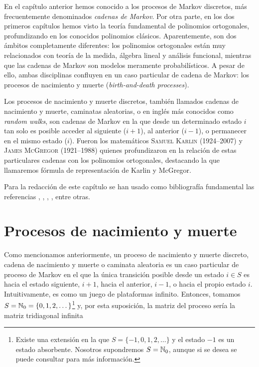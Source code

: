 
En el capítulo anterior hemos conocido a los procesos de Markov discretos, más frecuentemente denominados \textit{cadenas de Markov}. Por otra parte, en los dos primeros capítulos hemos visto la teoría fundamental de polinomios ortogonales, profundizando en los conocidos polinomios clásicos. Aparentemente, son dos ámbitos completamente diferentes: los polinomios ortogonales están muy relacionados con teoría de la medida, álgebra lineal y análisis funcional, mientras que las cadenas de Markov son modelos meramente probabilísticos. A pesar de ello, ambas disciplinas confluyen en un caso particular de cadena de Markov: los procesos de nacimiento y muerte (\textit{birth-and-death processes}). 

Los procesos de nacimiento y muerte discretos, también llamados cadenas de nacimiento y muerte, caminatas aleatorias, o en inglés más conocidos como \textit{random walks}, son cadenas de Markov en la que desde un determinado estado $i$ tan solo es posible acceder al siguiente ($i+1$), al anterior ($i-1$), o permanecer en el mismo estado ($i$). Fueron los matemáticos \textsc{Samuel Karlin} (1924--2007) y \textsc{James McGregor} (1921--1988) quienes profundizaron en la relación de estas particulares cadenas con los polinomios ortogonales, destacando la que llamaremos fórmula de representación de Karlin y McGregor.

Para la redacción de este capítulo se han usado como bibliografía fundamental las referencias \cite{differential-equations}, \cite{Linear-Growth}, \cite{random-walks}, \cite[Ch. II]{schoutens-2000}, \cite[Ch. II, III]{Manuel} entre otras.

\section{Procesos de nacimiento y muerte}
\label{sec:PNM}

Como mencionamos anteriormente, un proceso de nacimiento y muerte discreto, cadena de nacimiento y muerte o caminata aleatoria es un caso particular de proceso de Markov en el que la única transición posible desde un estado $i\in S$ es hacia el estado siguiente, $i+1$, hacia el anterior, $i-1$, o hacia el propio estado $i$. Intuitivamente, es como un juego de plataformas infinito. Entonces, tomamos $S=\mathbb{N}_0 = \{0,1,2,\dots\}$\footnote{Existe una extensión en la que $S = \{-1,0,1,2,\dots\}$ y el estado $-1$ es un estado absorbente. Nosotros supondremos $S=\mathbb{N}_0$, aunque si se desea se puede consultar \cite[Ch. II, Section 2.3]{schoutens-2000} para más información.} y, por esta suposición, la matriz del proceso sería la matriz tridiagonal infinita

